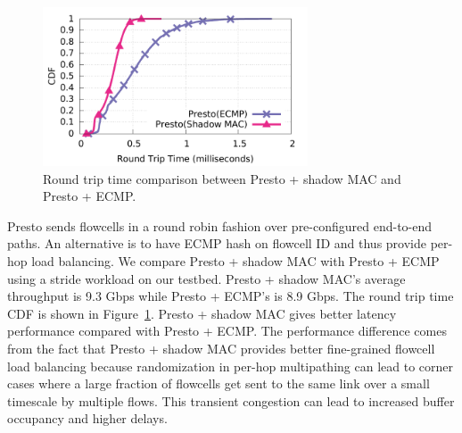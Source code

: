 \begin{figure}[!t]
        \centering
  \includegraphics[width=0.7\textwidth]{presto/figures/presto_compare_2modes/presto_compare_2mods.pdf}
        \caption{Round trip time comparison between Presto + shadow MAC and Presto + ECMP.
		}
        \label{micro_presto_2mods}
\end{figure}

Presto sends flowcells in a round robin fashion over pre-configured end-to-end paths. An alternative is to
have ECMP hash on flowcell ID and thus provide per-hop load balancing. 
We compare Presto + shadow MAC with Presto + ECMP using a stride workload on our testbed. 
Presto + shadow MAC's average throughput is 9.3 Gbps while Presto + ECMP's is 8.9 Gbps.
The round trip time CDF is shown in Figure~\ref{micro_presto_2mods}. 
Presto + shadow MAC gives better latency performance compared with Presto + ECMP. 
The performance difference comes from the fact that Presto + shadow MAC provides 
better fine-grained flowcell load balancing because 
randomization in per-hop multipathing can lead to corner cases where
a large fraction of flowcells get sent to the same link over a small timescale by multiple flows. This transient congestion
can lead to increased buffer occupancy and higher delays.
